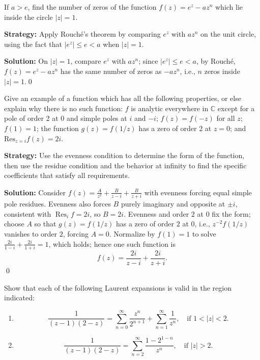 \begin{problembox}
\begin{problemstatement}
If \( a > e \), find the number of zeros of the function \( f(z) = e^z - a z^n \) which lie inside the circle \( |z| = 1 \).
\end{problemstatement}
\end{problembox}

\noindent\textbf{Strategy:} Apply Rouché's theorem by comparing \( e^z \) with \( a z^n \) on the unit circle, using the fact that \( |e^z| \leq e < a \) when \( |z| = 1 \).

\bigskip\noindent\textbf{Solution:}
On $|z|=1$, compare $e^z$ with $a z^n$; since $|e^z|\le e< a$, by Rouché, $f(z)=e^z-az^n$ has the same number of zeros as $-az^n$, i.e., $n$ zeros inside $|z|=1$.\qed


\begin{problembox}
\begin{problemstatement}
Give an example of a function which has all the following properties, or else explain why there is no such function: \( f \) is analytic everywhere in \( \mathbb{C} \) except for a pole of order 2 at 0 and simple poles at \( i \) and \( -i \); \( f(z) = f(-z) \) for all \( z \); \( f(1) = 1 \); the function \( g(z) = f(1/z) \) has a zero of order 2 at \( z = 0 \); and \( \text{Res}_{z=i} f(z) = 2i \).
\end{problemstatement}
\end{problembox}

\noindent\textbf{Strategy:} Use the evenness condition to determine the form of the function, then use the residue condition and the behavior at infinity to find the specific coefficients that satisfy all requirements.

\bigskip\noindent\textbf{Solution:}
Consider $f(z)=\frac{A}{z^2}+\frac{B}{z-i}+\frac{B}{z+i}$ with evenness forcing equal simple pole residues. Evenness also forces $B$ purely imaginary and opposite at $\pm i$, consistent with $\operatorname{Res}_{i}f=2i$, so $B=2i$. Evenness and order $2$ at $0$ fix the form; choose $A$ so that $g(z)=f(1/z)$ has a zero of order $2$ at $0$, i.e., $z^{-2}f(1/z)$ vanishes to order $2$, forcing $A=0$. Normalize by $f(1)=1$ to solve $\frac{2i}{1-i}+\frac{2i}{1+i}=1$, which holds; hence one such function is
\[f(z)=\frac{2i}{z-i}+\frac{2i}{z+i}.
\]\qed


\begin{problembox}
\begin{problemstatement}
Show that each of the following Laurent expansions is valid in the region indicated:
\begin{enumerate}[label=(\alph*)]
\item \[ \frac{1}{(z - 1)(2 - z)} = \sum_{n=0}^{\infty} \frac{z^n}{2^{n+1}} + \sum_{n=1}^{\infty} \frac{1}{z^n}, \quad \text{if } 1 < |z| < 2. \]
\item \[ \frac{1}{(z - 1)(2 - z)} = \sum_{n=2}^{\infty} \frac{1 - 2^{1-n}}{z^n}, \quad \text{if } |z| > 2. \]
\end{enumerate}
\end{problemstatement}
\end{problembox}


